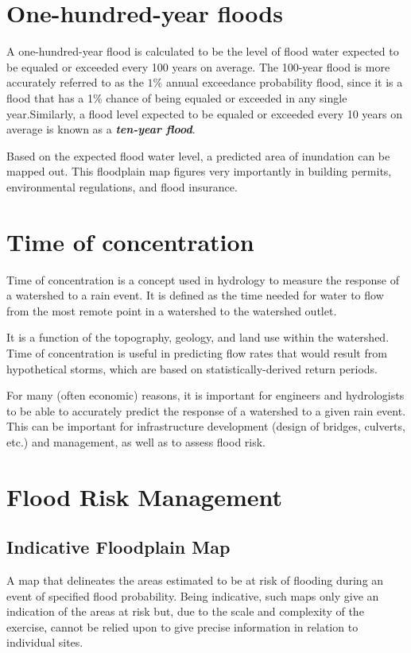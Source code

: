 \documentclass[12pt, a4paper]{article}
\theoremstyle{plain}
\theoremstyle{definition}
\theoremstyle{remark}
\begin{document}
\section{One-hundred-year floods }
A one-hundred-year flood is calculated to be the level of flood water expected to be equaled or exceeded every 100 years on average. The 100-year flood is more accurately referred to as the $1\%$ annual exceedance probability flood, since it is a flood that has a 1\% chance of being equaled or exceeded in any single
year.Similarly, a flood level expected to be equaled or exceeded every 10 years on average is known as a \textbf{\emph{ten-year
flood}}.

Based on the expected flood water level, a predicted area of inundation can be mapped out. This floodplain map figures very
importantly in building permits, environmental regulations, and flood insurance.

\section{Time of concentration}
Time of concentration is a concept used in hydrology to measure the response of a watershed to a rain event. It is defined as the
time needed for water to flow from the most remote point in a watershed to the watershed outlet.

It is a function of the topography, geology, and land use within the watershed. Time of concentration is useful in predicting flow
rates that would result from hypothetical storms, which are based on statistically-derived return periods.

For many (often economic) reasons, it is important for engineers and hydrologists to be able to accurately predict the response of a watershed to a given rain event. This can be important for
infrastructure development (design of bridges, culverts, etc.) and management, as well as to assess flood risk.

\section{Flood Risk Management}
\subsection{Indicative Floodplain Map}

A map that delineates the areas estimated to be at risk of flooding during an event of specified flood
probability. Being indicative, such maps only give an indication of the areas at risk but, due to the scale and
complexity of the exercise, cannot be relied upon to give precise information in relation to individual sites.
\end{document}
